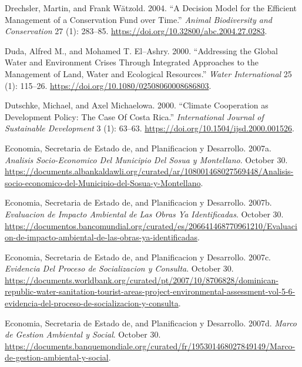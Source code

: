 \begin{CSLReferences}{1}{1}
Drechsler, Martin, and Frank Wätzold. 2004. {``A Decision Model for the
Efficient Management of a Conservation Fund over Time.''} \emph{Animal
Biodiversity and Conservation} 27 (1): 283--85.
\url{https://doi.org/10.32800/abc.2004.27.0283}.

Duda, Alfred M., and Mohamed T. El--Ashry. 2000. {``Addressing the
Global Water and Environment Crises Through Integrated Approaches to the
Management of Land, Water and Ecological Resources.''} \emph{Water
International} 25 (1): 115--26.
\url{https://doi.org/10.1080/02508060008686803}.

Dutschke, Michael, and Axel Michaelowa. 2000. {``Climate Cooperation as
Development Policy: The Case Of Costa Rica.''} \emph{International
Journal of Sustainable Development} 3 (1): 63--63.
\url{https://doi.org/10.1504/ijsd.2000.001526}.

Economia, Secretaria de Estado de, and Planificacion y Desarrollo.
2007a. \emph{Analisis Socio-Economico Del Municipio Del Sosua y
Montellano}. October 30.
\url{https://documents.albankaldawli.org/curated/ar/108001468027569448/Analisis-socio-economico-del-Municipio-del-Sosua-y-Montellano}.

Economia, Secretaria de Estado de, and Planificacion y Desarrollo.
2007b. \emph{Evaluacion de Impacto Ambiental de Las Obras Ya
Identificadas}. October 30.
\url{https://documentos.bancomundial.org/curated/es/206641468770961210/Evaluacion-de-impacto-ambiental-de-las-obras-ya-identificadas}.

Economia, Secretaria de Estado de, and Planificacion y Desarrollo.
2007c. \emph{Evidencia Del Proceso de Socializacion y Consulta}. October
30.
\url{https://documents.worldbank.org/curated/pt/2007/10/8706828/dominican-republic-water-sanitation-tourist-areas-project-environmental-assessment-vol-5-6-evidencia-del-proceso-de-socializacion-y-consulta}.

Economia, Secretaria de Estado de, and Planificacion y Desarrollo.
2007d. \emph{Marco de Gestion Ambiental y Social}. October 30.
\url{https://documents.banquemondiale.org/curated/fr/195301468027849149/Marco-de-gestion-ambiental-y-social}.


\end{CSLReferences}
